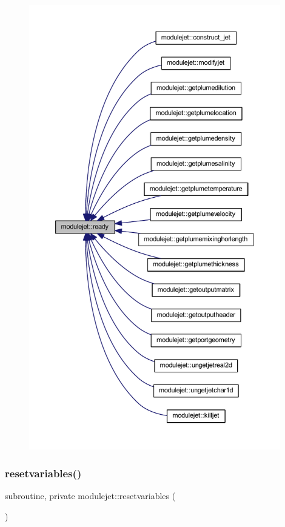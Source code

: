 \begin{figure}[H]
\begin{center}
\leavevmode
\includegraphics[height=550pt]{namespacemodulejet_a08cf17884b67eb6e393c3f7553f6398f_icgraph}
\end{center}
\end{figure}
\mbox{\label{namespacemodulejet_ab0790a91803700e0bd5e3ef9db5242c1}} 
\subsubsection{\texorpdfstring{resetvariables()}{resetvariables()}}
{\footnotesize\ttfamily subroutine, private modulejet\+::resetvariables (\begin{DoxyParamCaption}{ }\end{DoxyParamCaption})\hspace{0.3cm}{\ttfamily [private]}}

